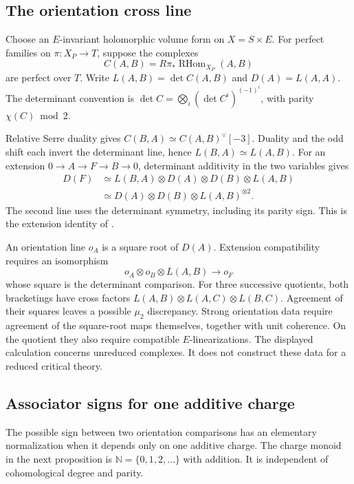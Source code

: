 \documentclass[11pt]{article}
\begin{document}
\subsection{The orientation cross line}

Choose an $E$-invariant holomorphic volume form on $X=S\times E$.
For perfect families on $\pi:X_P\to T$, suppose the complexes
\[
 C(A,B)=R\pi_*\operatorname{RHom}_{X_P}(A,B)
\]
are perfect over $T$.
Write $L(A,B)=\det C(A,B)$ and $D(A)=L(A,A)$.
The determinant convention is
$\det C=\bigotimes_i(\det C^i)^{(-1)^i}$, with parity
$\chi(C)\bmod2$.

Relative Serre duality gives
$C(B,A)\simeq C(A,B)^\vee[-3]$.
Duality and the odd shift each invert the determinant line, hence
$L(B,A)\simeq L(A,B)$.
For an extension $0\to A\to F\to B\to0$, determinant additivity
in the two variables gives
\[
 \begin{split}
 D(F)
 &\simeq L(B,A)\otimes D(A)\otimes D(B)\otimes L(A,B)\\
 &\simeq D(A)\otimes D(B)\otimes L(A,B)^{\otimes2}.
 \end{split}
\]
The second line uses the determinant symmetry, including its parity
sign. This is the extension identity of
\cite[equations (4.3)--(4.5)]{JoyceUpmeier2021}.

An orientation line $o_A$ is a square root of $D(A)$.
Extension compatibility requires an isomorphism
\begin{equation}\label{orientation-cross-map}
 o_A\otimes o_B\otimes L(A,B)\longrightarrow o_F
\end{equation}
whose square is the determinant comparison.
For three successive quotients, both bracketings have cross factors
$L(A,B)\otimes L(A,C)\otimes L(B,C)$.
Agreement of their squares leaves a possible $\mu_2$ discrepancy.
Strong orientation data require agreement of the square-root maps
themselves, together with unit coherence.
On the quotient they also require compatible $E$-linearizations.
The displayed calculation concerns unreduced complexes.
It does not construct these data for a reduced critical theory.

\subsection{Associator signs for one additive charge}

The possible sign between two orientation comparisons has an elementary
normalization when it depends only on one additive charge. The charge
monoid in the next proposition is $\mathbb N=\{0,1,2,\ldots\}$ with
addition. It is independent of cohomological degree and parity.
\end{document}
